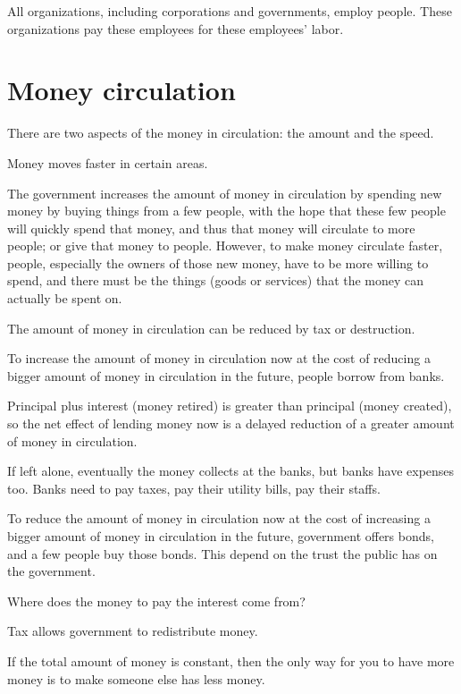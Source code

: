 All organizations, including corporations and governments, employ people.
These organizations pay these employees for these employees' labor.

\section{Money circulation}

There are two aspects of the money in circulation: the amount and the speed.

Money moves faster in certain areas.

The government increases the amount of money in circulation
by spending new money by buying things from a few people,
with the hope that these few people will quickly spend that money,
and thus that money will circulate to more people; or give that money to people.
However, to make money circulate faster,
people, especially the owners of those new money,
have to be more willing to spend,
and there must be the things (goods or services)
that the money can actually be spent on.

The amount of money in circulation can be reduced by tax or destruction.

To increase the amount of money in circulation now
at the cost of reducing a bigger amount of money in circulation in the future,
people borrow from banks.

Principal plus interest (money retired) is greater than principal (money created),
so the net effect of lending money now
is a delayed reduction of a greater amount of money in circulation.

If left alone, eventually the money collects at the banks,
but banks have expenses too.
Banks need to pay taxes, pay their utility bills,
pay their staffs.

To reduce the amount of money in circulation now
at the cost of increasing a bigger amount of money in circulation in the future,
government offers bonds, and a few people buy those bonds.
This depend on the trust the public has on the government.

Where does the money to pay the interest come from?

Tax allows government to redistribute money.

If the total amount of money is constant,
then the only way for you to have more money
is to make someone else has less money.
